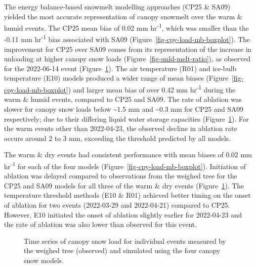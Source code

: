 \documentclass[
]{agujournal2019}
\begin{document}
The energy balance-based snowmelt modelling approaches (CP25 \& SA09)
yielded the most accurate representation of canopy snowmelt over the
warm \& humid events. The CP25 mean bias of 0.02 mm
hr\textsuperscript{-1}, which was smaller than the -0.11 mm
hr\textsuperscript{-1} bias associated with SA09
(Figure~\ref{fig-cpy-load-mb-boxplot}). The improvement for CP25 over
SA09 comes from its representation of the increase in unloading at
higher canopy snow loads (Figure~\ref{fig-unld-melt-ratio}), as observed
for the 2022-06-14 event (Figure~\ref{fig-obs-mod-w-tree}). The air
temperature (R01) and ice-bulb temperature (E10) models produced a wider
range of mean biases (Figure~\ref{fig-cpy-load-mb-boxplot}) and larger
mean bias of over 0.42 mm hr\textsuperscript{-1} during the warm \&
humid events, compared to CP25 and SA09. The rate of ablation was slower
for canopy snow loads below \textasciitilde1.5 mm and \textasciitilde0.3
mm for CP25 and SA09 respectively; due to their differing liquid water
storage capacities (Figure~\ref{fig-obs-mod-w-tree}). For the warm
events other than 2022-04-23, the observed decline in ablation rate
occurs around 2 to 3 mm, exceeding the threshold predicted by all
models.

The warm \& dry events had consistent performance with mean biases of
0.02 mm hr\textsuperscript{-1} for each of the four models
(Figure~\ref{fig-cpy-load-mb-boxplot}). Initiation of ablation was
delayed compared to observations from the weighed tree for the CP25 and
SA09 models for all three of the warm \& dry events
(Figure~\ref{fig-obs-mod-w-tree}). The temperature threshold methods
(E10 \& R01) achieved better timing on the onset of ablation for two
events (2022-03-29 and 2022-04-21) compared to CP25. However, E10
initiated the onset of ablation slightly earlier for 2022-04-23 and the
rate of ablation was also lower than observed for this event.

\begin{figure}[htbp]


\caption{\label{fig-obs-mod-w-tree}Time series of canopy snow load for
individual events measured by the weighed tree (observed) and simulated
using the four canopy snow models.}

\end{figure}%
\end{document}
